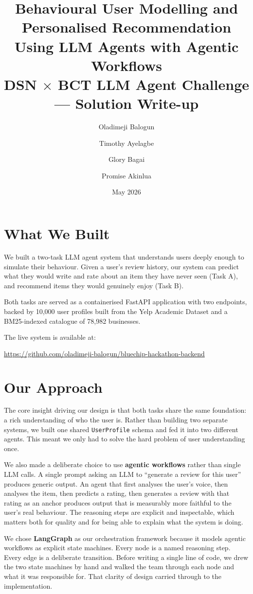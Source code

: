 \documentclass[11pt,a4paper]{article}
\title{
    \Large \textbf{Behavioural User Modelling and Personalised Recommendation} \\
    \large \textbf{Using LLM Agents with Agentic Workflows} \\
    \vspace{0.5em}
    \normalsize DSN $\times$ BCT LLM Agent Challenge --- Solution Write-up
}
\author{
    Oladimeji Balogun \and
    Timothy Ayelagbe \and
    Glory Bagai \and
    Promise Akinlua
}
\date{May 2026}
\begin{document}
\maketitle

\section{What We Built}

We built a two-task LLM agent system that understands users deeply enough
to simulate their behaviour. Given a user's review history, our system can
predict what they would write and rate about an item they have never seen
(Task A), and recommend items they would genuinely enjoy (Task B).

Both tasks are served as a containerised FastAPI application with two
endpoints, backed by 10,000 user profiles built from the Yelp Academic
Dataset and a BM25-indexed catalogue of 78,982 businesses.

The live system is available at:
\begin{center}
\url{https://github.com/oladimeji-balogun/bluechip-hackathon-backend}
\end{center}

\section{Our Approach}

The core insight driving our design is that both tasks share the same
foundation: a rich understanding of who the user is. Rather than building
two separate systems, we built one shared \texttt{UserProfile} schema and
fed it into two different agents. This meant we only had to solve the hard
problem of user understanding once.

We also made a deliberate choice to use \textbf{agentic workflows} rather
than single LLM calls. A single prompt asking an LLM to ``generate a
review for this user'' produces generic output. An agent that first
analyses the user's voice, then analyses the item, then predicts a rating,
then generates a review with that rating as an anchor produces output that
is measurably more faithful to the user's real behaviour. The reasoning
steps are explicit and inspectable, which matters both for quality and for
being able to explain what the system is doing.

We chose \textbf{LangGraph} as our orchestration framework because it
models agentic workflows as explicit state machines. Every node is a named
reasoning step. Every edge is a deliberate transition. Before writing a
single line of code, we drew the two state machines by hand and walked the
team through each node and what it was responsible for. That clarity of
design carried through to the implementation.
\end{document}
